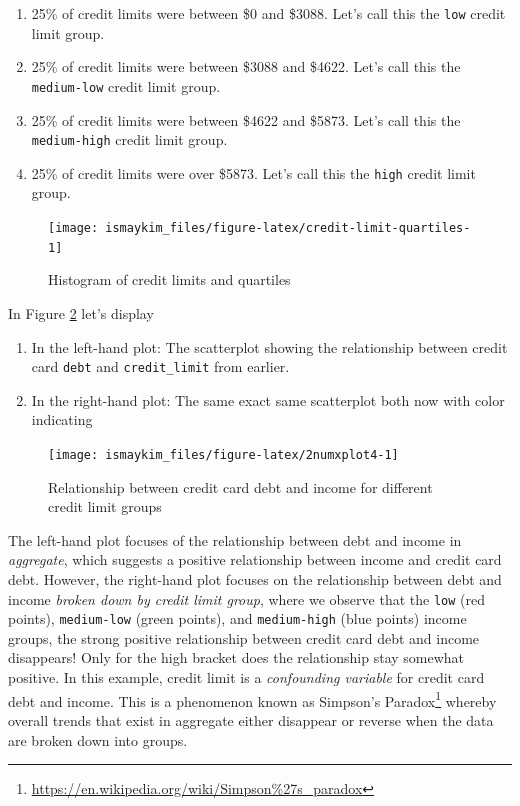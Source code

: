 \documentclass[12pt, krantz2,]{krantz}
\providecommand{\tightlist}{%
  \setlength{\itemsep}{0pt}\setlength{\parskip}{0pt}}
\renewcommand{\href}[2]{#2\footnote{\url{#1}}}
\begin{document}
\begin{enumerate}
\def\labelenumi{\arabic{enumi}.}
\tightlist
\item
  25\% of credit limits were between \$0 and \$3088. Let's call this the \texttt{low} credit limit group.
\item
  25\% of credit limits were between \$3088 and \$4622. Let's call this the \texttt{medium-low} credit limit group.
\item
  25\% of credit limits were between \$4622 and \$5873. Let's call this the \texttt{medium-high} credit limit group.
\item
  25\% of credit limits were over \$5873. Let's call this the \texttt{high} credit limit group.
\end{enumerate}

\begin{figure}

{\centering \texttt{[image: ismaykim\_files/figure-latex/credit-limit-quartiles-1]} 

}

\caption{Histogram of credit limits and quartiles}\label{fig:credit-limit-quartiles}
\end{figure}

In Figure \ref{fig:2numxplot4} let's display

\begin{enumerate}
\def\labelenumi{\arabic{enumi}.}
\tightlist
\item
  In the left-hand plot: The scatterplot showing the relationship between credit card \texttt{debt} and \texttt{credit\_limit} from earlier.
\item
  In the right-hand plot: The same exact same scatterplot both now with color indicating
\end{enumerate}

\begin{figure}

{\centering \texttt{[image: ismaykim\_files/figure-latex/2numxplot4-1]} 

}

\caption{Relationship between credit card debt and income for different credit limit groups}\label{fig:2numxplot4}
\end{figure}

The left-hand plot focuses of the relationship between debt and income in \emph{aggregate}, which suggests a positive relationship between income and credit card debt. However, the right-hand plot focuses on the relationship between debt and income \emph{broken down by credit limit group}, where we observe that the \texttt{low} (red points), \texttt{medium-low} (green points), and \texttt{medium-high} (blue points) income groups, the strong positive relationship between credit card debt and income disappears! Only for the high bracket does the relationship stay somewhat positive. In this example, credit limit is a \emph{confounding variable} for credit card debt and income. This is a phenomenon known as \href{https://en.wikipedia.org/wiki/Simpson\%27s_paradox}{Simpson's Paradox} whereby overall trends that exist in aggregate either disappear or reverse when the data are broken down into groups.
\end{document}
